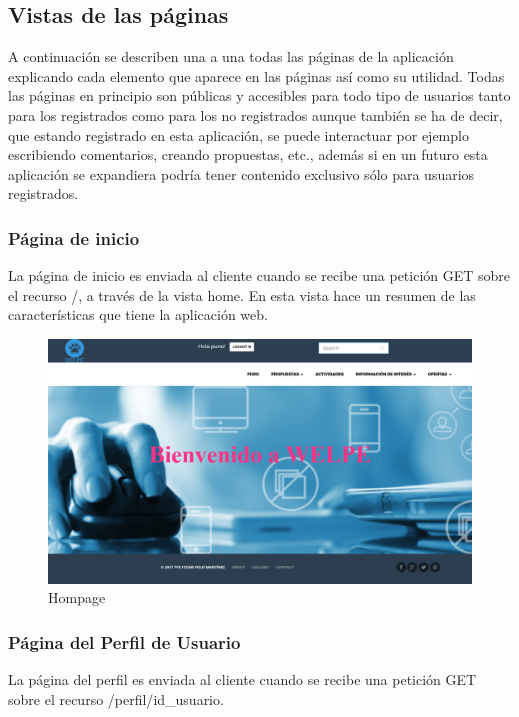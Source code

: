 \subsection{Vistas de las páginas} 
\label{subsec:vistas}

A continuación se describen una a una todas las páginas de la aplicación explicando cada elemento que aparece en las páginas así como su utilidad. Todas las páginas en principio son públicas y accesibles para todo tipo de usuarios tanto para los registrados como para los no registrados aunque también se ha de decir, que estando registrado en esta aplicación, se puede interactuar por ejemplo escribiendo comentarios, creando propuestas, etc., además si en un futuro esta aplicación se expandiera podría tener contenido exclusivo sólo para usuarios registrados.


\subsubsection{Página de inicio}
\label{subsubsec:home}


La página de inicio es enviada al cliente cuando se recibe una petición GET sobre el recurso /, a través de la vista home. En esta vista hace un resumen de las características que tiene la aplicación web.

 \begin{figure}[H]
    \centering
    \includegraphics[width=12cm]{img/home}
    \caption{Hompage}
    \label{figura:home}
 \end{figure}
 
 
\subsubsection{Página del Perfil de Usuario}
\label{subsubsec:profile}

La página del perfil es enviada al cliente cuando se recibe una petición GET sobre el recurso /perfil/{id\_usuario}.


